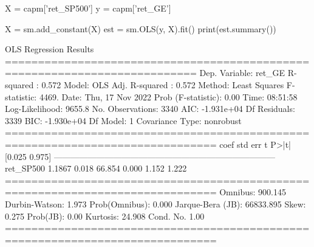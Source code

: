 \begin{ipython}
X = capm['ret_SP500']
y = capm['ret_GE']

X = sm.add_constant(X)
est = sm.OLS(y, X).fit()
print(est.summary())
\end{ipython}
\begin{ioutput}
                           OLS Regression Results                                
===========================================================================
Dep. Variable:                 ret_GE   R-squared :                   0.572
Model:                            OLS   Adj. R-squared :              0.572
Method:                 Least Squares   F-statistic:                  4469.
Date:                Thu, 17 Nov 2022   Prob (F-statistic):            0.00
Time:                        08:51:58   Log-Likelihood:              9655.8
No. Observations:                3340   AIC:                     -1.931e+04
Df Residuals:                    3339   BIC:                     -1.930e+04
Df Model:                           1                                                  
Covariance Type:            nonrobust                                                  
==============================================================================
                 coef    std err          t      P>|t|      [0.025      0.975]
------------------------------------------------------------------------------
ret_SP500      1.1867      0.018     66.854      0.000       1.152       1.222
==============================================================================
Omnibus:                      900.145   Durbin-Watson:                   1.973
Prob(Omnibus):                  0.000   Jarque-Bera (JB):            66833.895
Skew:                           0.275   Prob(JB):                         0.00
Kurtosis:                      24.908   Cond. No.                         1.00
==============================================================================
\end{ioutput}

